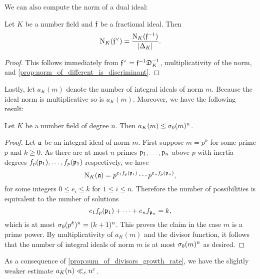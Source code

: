     We can also compute the norm of a dual ideal:

    \begin{corollary}\label{cor:norm_of_different}
      Let $K$ be a number field and $\mathfrak{f}$ be a fractional ideal. Then
      \[
        \operatorname{\mathrm{N}}_{K}(\mathfrak{f}^{\vee}) = \frac{\operatorname{\mathrm{N}}_{K}(\mathfrak{f}^{-1})}{|\Delta_{K}|}.
      \]
    \end{corollary}
    \begin{proof}
      This follows immediately from $\mathfrak{f}^{\vee} = \mathfrak{f}^{-1}\mathfrak{D}_{K}^{-1}$, multiplicativity of the norm, and \cref{prop:norm_of_different_is_discriminant}.
    \end{proof}

    Lastly, let $a_{K}(m)$ denote the number of integral ideals of norm $m$. Because the ideal norm is multiplicative so is $a_{K}(m)$. Moreover, we have the following result:

    \begin{proposition}\label{equ:ideals_of_fixed_norm_bound}
      Let $K$ be a number field of degree $n$. Then $a_{K}(m) \le \sigma_{0}(m)^{n}$.
    \end{proposition}
    \begin{proof}
      Let $\mathfrak{a}$ be an integral ideal of norm $m$. First suppose $m = p^{k}$ for some prime $p$ and $k \ge 0$. As there are at most $n$ primes $\mathfrak{p}_{1},\ldots,\mathfrak{p}_{n}$ above $p$ with inertia degrees $f_{p}(\mathfrak{p}_{1}),\ldots,f_{p}(\mathfrak{p}_{1})$ respectively, we have
      \[
        \operatorname{\mathrm{N}}_{K}(\mathfrak{a}) = p^{e_{1}f_{p}(\mathfrak{p}_{1})} \cdots p^{e_{n}f_{p}(\mathfrak{p}_{n})},
      \]
      for some integers $0 \le e_{i} \le k$ for $1 \le i \le n$. Therefore the number of possibilities is equivalent to the number of solutions
      \[
        e_{1}f_{p}(\mathfrak{p}_{1})+\cdots+e_{n}f_{\mathfrak{p}_{n}} = k,
      \]
      which is at most $\sigma_{0}(p^{k})^{n} = (k+1)^{n}$. This proves the claim in the case $m$ is a prime power. By multiplicativity of $a_{K}(m)$ and the divisor function, it follows that the number of integral ideals of norm $m$ is at most $\sigma_{0}(m)^{n}$ as desired.
    \end{proof}

    As a consequence of \cref{prop:sum_of_divisors_growth_rate}, we have the slightly weaker estimate $a_{K}(n) \ll_{\varepsilon} n^{\varepsilon}$.
